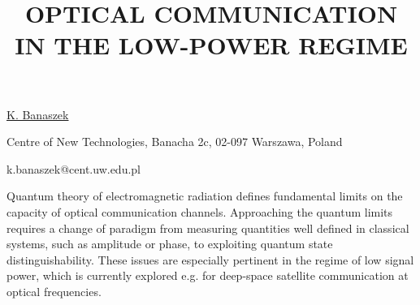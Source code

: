 \title{OPTICAL COMMUNICATION IN THE LOW-POWER REGIME}

\underline{K. Banaszek} 

{\normalsize{\vspace{-4mm}
Centre of New Technologies,
Banacha 2c,
02-097 Warszawa,
Poland

\email k.banaszek@cent.uw.edu.pl}}

Quantum theory of electromagnetic radiation defines fundamental limits on the capacity of optical communication channels. Approaching the quantum limits requires a change of paradigm from measuring quantities well defined in classical systems, such as amplitude or phase, to exploiting quantum state distinguishability. These issues are especially pertinent in the regime of low signal power, which is currently explored e.g. for deep-space satellite communication at optical frequencies.


\vspace{\baselineskip} 